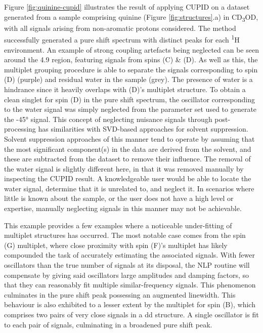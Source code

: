 Figure \ref{fig:quinine-cupid} illustrates the result of applying \ac{CUPID} on
a dataset generated from a sample comprising quinine (Figure
\ref{fig:structures}.a) in CD\textsubscript{3}OD,
with all signals arising from non-aromatic protons considered. The method
successfully generated a pure shift spectrum with distinct peaks for each
\textsuperscript{1}H environment.
An example of strong coupling artefacts being neglected can be seen
around the \qty{4.9}{\partspermillion} region, featuring signals from spins (C)
\& (D). As well as this, the multiplet grouping procedure is able to separate
the signals corresponding to spin (D) (purple) and residual water in the sample
(grey).
The presence of water is a hindrance since it heavily overlaps with (D)'s
multiplet structure.
To obtain a clean singlet for spin (D) in the pure shift spectrum, the
oscillator corresponding to the water signal was simply neglected from
the parameter set used to generate the \ang{-45} signal. This concept of
neglecting nuisance signals through post-processing has similarities with
\ac{SVD}-based approaches for solvent suppression\cite{Zhu1997}.
Solvent suppression approaches of this manner tend to operate by assuming
that the most significant component(s) in the data are derived from the
solvent, and these are subtracted from the dataset to
remove their influence. The removal of the water signal is slightly
different here, in that it was removed manually by inspecting the
\ac{CUPID} result. A knowledgeable user would be able to locate the water
signal, determine that it is unrelated to, and neglect it. In scenarios where
little is known about the sample, or the user does not have a high level or
expertise, manually neglecting signals in this manner may not be achievable.

This example provides a few examples where a noticeable under-fitting of
multiplet structures has occurred.
The most notable case comes from the spin (G) multiplet, where close proximity
with spin (F)'s multiplet has likely compounded the task of accurately
estimating the associated signals. With fewer oscillators than the true number
of signals at its disposal, the \ac{NLP} routine will compensate
by giving said oscillators large amplitudes and damping factors, so that they
can reasonably fit multiple similar-frequency signals. This phenomenon
culminates in the pure shift peak possessing an augmented linewidth.
This behaviour is also exhibited to a lesser extent by the multiplet for spin
(B), which comprises two pairs of very close signals in a dd structure. A
single oscillator is fit to each pair of signals, culminating in a broadened
pure shift peak.

